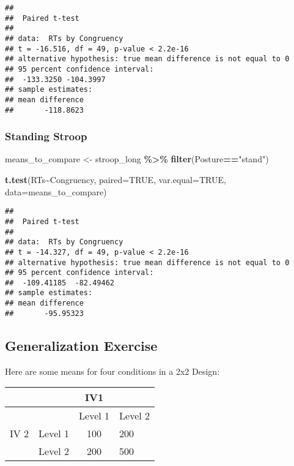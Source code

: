 \documentclass[
]{book}
\newenvironment{Shaded}{\begin{snugshade}}{\end{snugshade}}
\newcommand{\AttributeTok}[1]{\textcolor[rgb]{0.13,0.29,0.53}{#1}}
\newcommand{\ConstantTok}[1]{\textcolor[rgb]{0.56,0.35,0.01}{#1}}
\newcommand{\FunctionTok}[1]{\textcolor[rgb]{0.13,0.29,0.53}{\textbf{#1}}}
\newcommand{\NormalTok}[1]{#1}
\newcommand{\OtherTok}[1]{\textcolor[rgb]{0.56,0.35,0.01}{#1}}
\newcommand{\SpecialCharTok}[1]{\textcolor[rgb]{0.81,0.36,0.00}{\textbf{#1}}}
\newcommand{\StringTok}[1]{\textcolor[rgb]{0.31,0.60,0.02}{#1}}
\begin{document}
\begin{verbatim}
## 
##  Paired t-test
## 
## data:  RTs by Congruency
## t = -16.516, df = 49, p-value < 2.2e-16
## alternative hypothesis: true mean difference is not equal to 0
## 95 percent confidence interval:
##  -133.3250 -104.3997
## sample estimates:
## mean difference 
##       -118.8623
\end{verbatim}

\hypertarget{standing-stroop}{%
\subsubsection{Standing Stroop}\label{standing-stroop}}

\begin{Shaded}
\begin{Highlighting}[]
\NormalTok{means\_to\_compare }\OtherTok{\textless{}{-}}\NormalTok{ stroop\_long }\SpecialCharTok{\%\textgreater{}\%}
                      \FunctionTok{filter}\NormalTok{(Posture}\SpecialCharTok{==}\StringTok{"stand"}\NormalTok{)}

\FunctionTok{t.test}\NormalTok{(RTs}\SpecialCharTok{\textasciitilde{}}\NormalTok{Congruency, }\AttributeTok{paired=}\ConstantTok{TRUE}\NormalTok{, }\AttributeTok{var.equal=}\ConstantTok{TRUE}\NormalTok{, }\AttributeTok{data=}\NormalTok{means\_to\_compare)}
\end{Highlighting}
\end{Shaded}

\begin{verbatim}
## 
##  Paired t-test
## 
## data:  RTs by Congruency
## t = -14.327, df = 49, p-value < 2.2e-16
## alternative hypothesis: true mean difference is not equal to 0
## 95 percent confidence interval:
##  -109.41185  -82.49462
## sample estimates:
## mean difference 
##       -95.95323
\end{verbatim}

\hypertarget{generalization-exercise-9}{%
\subsection{Generalization Exercise}\label{generalization-exercise-9}}

Here are some means for four conditions in a 2x2 Design:

\begin{longtable}[]{@{}llcl@{}}
\toprule\noalign{}
& & IV1 & \\
\midrule\noalign{}
\endhead
\bottomrule\noalign{}
\endlastfoot
& & Level 1 & Level 2 \\
IV 2 & Level 1 & 100 & 200 \\
& Level 2 & 200 & 500 \\
\end{longtable}
\end{document}

